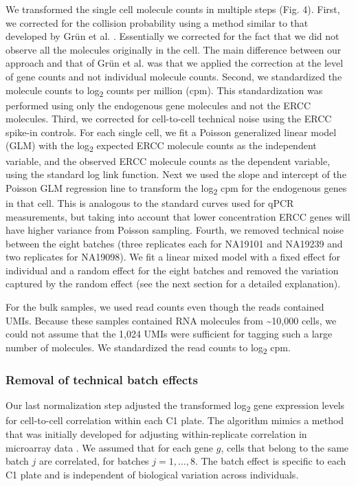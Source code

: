 We transformed the single cell molecule counts in multiple steps (Fig.
4). First, we corrected for the collision probability using a method
similar to that developed by Grün et al. \citep{Grun2014}. Essentially we
corrected for the fact that we did not observe all the molecules
originally in the cell. The main difference between our approach and
that of Grün et al. \citep{Grun2014} was that we applied the correction
at the level of gene counts and not individual molecule counts. Second,
we standardized the molecule counts to log\textsubscript{2} counts per
million (cpm). This standardization was performed using only the
endogenous gene molecules and not the ERCC molecules. Third, we
corrected for cell-to-cell technical noise using the ERCC spike-in
controls. For each single cell, we fit a Poisson generalized linear
model (GLM) with the log\textsubscript{2} expected ERCC molecule counts
as the independent variable, and the observed ERCC molecule counts as
the dependent variable, using the standard log link function. Next we
used the slope and intercept of the Poisson GLM regression line to
transform the log\textsubscript{2} cpm for the endogenous genes in that
cell. This is analogous to the standard curves used for qPCR
measurements, but taking into account that lower concentration ERCC
genes will have higher variance from Poisson sampling. Fourth, we
removed technical noise between the eight batches (three replicates each
for NA19101 and NA19239 and two replicates for NA19098). We fit a linear
mixed model with a fixed effect for individual and a random effect for
the eight batches and removed the variation captured by the random
effect (see the next section for a detailed explanation).

For the bulk samples, we used read counts even though the reads
contained UMIs. Because these samples contained RNA molecules from
\textasciitilde{}10,000 cells, we could not assume that the 1,024 UMIs
were sufficient for tagging such a large number of molecules. We
standardized the read counts to log\textsubscript{2} cpm.

\subsubsection{Removal of technical batch
effects}\label{removal-of-technical-batch-effects}

Our last normalization step adjusted the transformed
log\textsubscript{2} gene expression levels for cell-to-cell correlation
within each C1 plate. The algorithm mimics a method that was initially
developed for adjusting within-replicate correlation in microarray data
\citep{Smyth2005}. We assumed that for each gene $g$, cells that belong
to the same batch $j$ are correlated, for batches $j = 1, \dots, 8$. The
batch effect is specific to each C1 plate and is independent of
biological variation across individuals.


